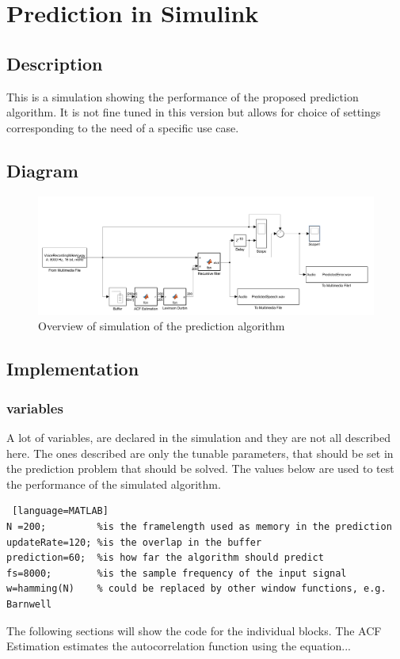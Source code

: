 
\section{Prediction in Simulink}


\subsection{Description}
This is a simulation showing the performance of the proposed prediction algorithm. It is not fine tuned in this version but allows for choice of settings corresponding to the need of a specific use case.  


\subsection{Diagram}
\begin{figure} [h]
	\centering
	\includegraphics[width=\textwidth]{../Journal/Code/SimulinkPrediction}
	\caption{Overview of simulation of the prediction algorithm}
	\label{Fig:PredictionSimulink}
\end{figure}


\subsection{Implementation}

\subsubsection{variables}
A lot of variables, are declared in the simulation and they are not all described here. The ones described are only the tunable parameters, that should be set in the prediction problem that should be solved. The values below are used to test the performance of the simulated algorithm. 
\begin{lstlisting} [language=MATLAB]
N =200; 		%is the framelength used as memory in the prediction
updateRate=120; %is the overlap in the buffer
prediction=60;  %is how far the algorithm should predict 
fs=8000; 		%is the sample frequency of the input signal 
w=hamming(N)	% could be replaced by other window functions, e.g. Barnwell
\end{lstlisting}
The following sections will show the code for the individual blocks. 
The ACF Estimation estimates the autocorrelation function using the equation...
